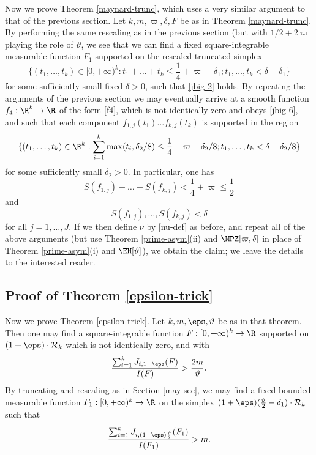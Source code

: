 Now we prove Theorem \ref{maynard-trunc}, which uses a very similar argument to that of the previous section.  Let $k, m, \varpi, \delta, F$ be as in Theorem \ref{maynard-trunc}.  By performing the same rescaling as in the previous section (but with $1/2 + 2\varpi$ playing the role of $\vartheta$, we see that we can find
a fixed square-integrable measurable function $F_1$ supported on the rescaled truncated simplex
$$ \{ (t_1,\dots,t_k) \in [0,+\infty)^k: t_1+\dots+t_k \leq \frac{1}{4} + \varpi - \delta_1; t_1,\dots,t_k < \delta - \delta_1 \}$$
for some sufficiently small fixed $\delta>0$, such that \eqref{jbig-2} holds.  By repeating the arguments of the previous section we may eventually arrive at a smooth function $f_4: \R^k \to \R$ of the form \eqref{f4}, which is not identically zero and obeys \eqref{jbig-6}, and such that each component $f_{1,j}(t_1) \dots f_{k,j}(t_k)$ is supported in the region
$$ \{ (t_1,\dots,t_k) \in \R^k: \sum_{i=1}^k \max(t_i, \delta_2/8) \leq \frac{1}{4}+\varpi - \delta_2/8; t_1,\dots,t_k < \delta - \delta_2/8 \}$$
for some sufficiently small $\delta_2>0$.  In particular, one has
$$
S(f_{1,j}) + \dots + S(f_{k,j}) < \frac{1}{4}+\varpi \leq \frac{1}{2}$$
and
$$ S(f_{1,j}),\dots,S(f_{k,j}) < \delta$$
for all $j=1,\dots,J$.   If we then define $\nu$ by \eqref{nu-def} as before, and repeat all of the above arguments (but use Theorem \ref{prime-asym}(ii) and $\MPZ[\varpi,\delta]$ in place of Theorem \ref{prime-asym}(i) and $\EH[\vartheta]$), we obtain the claim; we leave the details to the interested reader.

\subsection{Proof of Theorem \ref{epsilon-trick}}\label{trick-sec}

Now we prove Theorem \ref{epsilon-trick}. Let $k, m, \eps, \vartheta$ be as in that theorem.  Then one may find a square-integrable function $F: [0,+\infty)^k \to \R$ supported on $(1+\eps) \cdot {\mathcal R}_k$ which is not identically zero, and with
$$\frac{\sum_{i=1}^k J_{i,1-\eps}(F)}{I(F)} > \frac{2m}{\vartheta}.$$
By truncating and rescaling as in Section \ref{may-sec}, we may find a fixed bounded measurable function $F_1: [0,+\infty)^k \to \R$ on the simplex $(1+\eps) (\frac{\vartheta}{2}-\delta_1) \cdot {\mathcal R}_k$ such that 
$$\frac{\sum_{i=1}^k J_{i,(1-\eps) \frac{\vartheta}{2}}(F_1)}{I(F_1)} > m.$$

